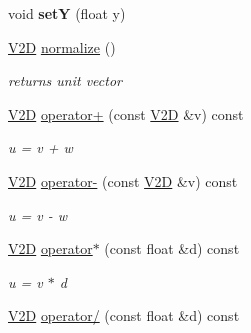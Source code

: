 \begin{DoxyCompactItemize}
\item 
\hypertarget{class_v2_d_ace206d03a2caa657de8b98ba278ba767}{void {\bfseries set\-Y} (float y)}\label{class_v2_d_ace206d03a2caa657de8b98ba278ba767}

\item 
\hypertarget{class_v2_d_a18db66d223c2a2fd279852e23ac8c79c}{\hyperlink{class_v2_d}{V2\-D} \hyperlink{class_v2_d_a18db66d223c2a2fd279852e23ac8c79c}{normalize} ()}\label{class_v2_d_a18db66d223c2a2fd279852e23ac8c79c}

\begin{DoxyCompactList}\small\item\em returns unit vector \end{DoxyCompactList}\item 
\hypertarget{class_v2_d_afa76dfe256b2709097757f50ba8adde5}{\hyperlink{class_v2_d}{V2\-D} \hyperlink{class_v2_d_afa76dfe256b2709097757f50ba8adde5}{operator+} (const \hyperlink{class_v2_d}{V2\-D} \&v) const }\label{class_v2_d_afa76dfe256b2709097757f50ba8adde5}

\begin{DoxyCompactList}\small\item\em u = v + w \end{DoxyCompactList}\item 
\hypertarget{class_v2_d_ad49cd439af57e78502633147381d4f5e}{\hyperlink{class_v2_d}{V2\-D} \hyperlink{class_v2_d_ad49cd439af57e78502633147381d4f5e}{operator-\/} (const \hyperlink{class_v2_d}{V2\-D} \&v) const }\label{class_v2_d_ad49cd439af57e78502633147381d4f5e}

\begin{DoxyCompactList}\small\item\em u = v -\/ w \end{DoxyCompactList}\item 
\hypertarget{class_v2_d_a8fb2f52d56ec45f508a062443c4ec542}{\hyperlink{class_v2_d}{V2\-D} \hyperlink{class_v2_d_a8fb2f52d56ec45f508a062443c4ec542}{operator$\ast$} (const float \&d) const }\label{class_v2_d_a8fb2f52d56ec45f508a062443c4ec542}

\begin{DoxyCompactList}\small\item\em u = v $\ast$ d \end{DoxyCompactList}\item 
\hypertarget{class_v2_d_a308fabbd4804f0380a3387e2fbdcf96a}{\hyperlink{class_v2_d}{V2\-D} \hyperlink{class_v2_d_a308fabbd4804f0380a3387e2fbdcf96a}{operator/} (const float \&d) const }\label{class_v2_d_a308fabbd4804f0380a3387e2fbdcf96a}


\end{DoxyCompactItemize}
